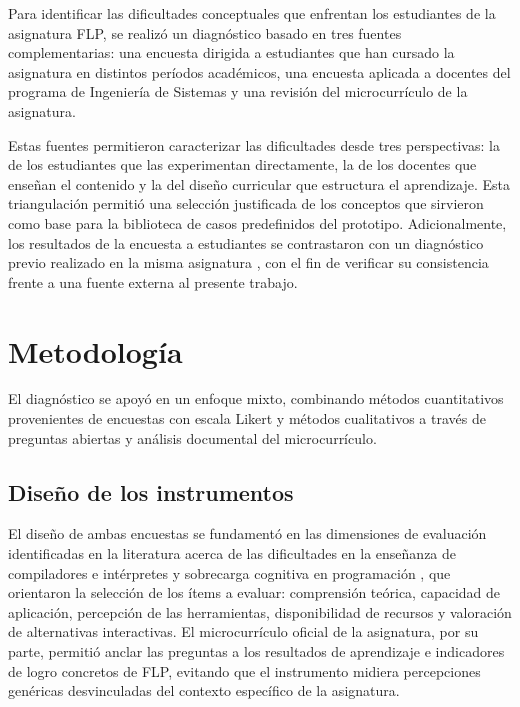 Para identificar las dificultades conceptuales que enfrentan los estudiantes de la asignatura FLP, se realizó un diagnóstico basado en tres fuentes complementarias: una encuesta dirigida a estudiantes que han cursado la asignatura en distintos períodos académicos, una encuesta aplicada a docentes del programa de Ingeniería de Sistemas y una revisión del microcurrículo de la asignatura.

Estas fuentes permitieron caracterizar las dificultades desde tres perspectivas: la de los estudiantes que las experimentan directamente, la de los docentes que enseñan el contenido y la del diseño curricular que estructura el aprendizaje. Esta triangulación permitió una selección justificada de los conceptos que sirvieron como base para la biblioteca de casos predefinidos del prototipo. Adicionalmente, los resultados de la encuesta a estudiantes se contrastaron con un diagnóstico previo realizado en la misma asignatura \cite{henao2026recomendacion}, con el fin de verificar su consistencia frente a una fuente externa al presente trabajo.

\section{Metodología}

El diagnóstico se apoyó en un enfoque mixto, combinando métodos cuantitativos provenientes de encuestas con escala Likert \cite{joshi2015likert} y métodos cualitativos a través de preguntas abiertas y análisis documental del microcurrículo.

\subsection{Diseño de los instrumentos}

El diseño de ambas encuestas se fundamentó en las dimensiones de evaluación identificadas en la literatura acerca de las dificultades en la enseñanza de compiladores e intérpretes \cite{Stamenkovic2024AWE,jovanovic2021comvis} y sobrecarga cognitiva en programación \cite{zagami2023}, que orientaron la selección de los ítems a evaluar: comprensión teórica, capacidad de aplicación, percepción de las herramientas, disponibilidad de recursos y valoración de alternativas interactivas. El microcurrículo oficial de la asignatura, por su parte, permitió anclar las preguntas a los resultados de aprendizaje e indicadores de logro concretos de FLP, evitando que el instrumento midiera percepciones genéricas desvinculadas del contexto específico de la asignatura.

